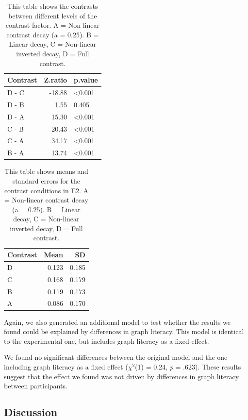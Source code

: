 \documentclass[preprint, 3p,
authoryear]{elsarticle} %
\begin{document}
\begin{table}

\caption{\label{tab:contrasts-table-e2}\label{contrasts-table-e2}This table shows the contrasts between different levels of the contrast factor. A = Non-linear contrast decay (a = 0.25). B = Linear decay, C = Non-linear inverted decay, D = Full contrast.}
\centering
\begin{tabular}[t]{lrl}
\toprule
Contrast & Z.ratio & p.value\\
\midrule
D - C & -18.88 & <0.001\\
D - B & 1.55 & 0.405\\
D - A & 15.30 & <0.001\\
C - B & 20.43 & <0.001\\
C - A & 34.17 & <0.001\\
\addlinespace
B - A & 13.74 & <0.001\\
\bottomrule
\end{tabular}
\end{table}

\begin{table}

\caption{\label{tab:sum-stats-e2}\label{sum-stats-e2}This table shows means and standard errors for the contrast conditions in E2. A = Non-linear contrast decay (a = 0.25). B = Linear decay, C = Non-linear inverted decay, D = Full contrast.}
\centering
\begin{tabular}[t]{lrr}
\toprule
Contrast & Mean & SD\\
\midrule
D & 0.123 & 0.185\\
C & 0.168 & 0.179\\
B & 0.119 & 0.173\\
A & 0.086 & 0.170\\
\bottomrule
\end{tabular}
\end{table}

Again, we also generated an additional model to test whether the results
we found could be explained by differences in graph literacy. This model
is identical to the experimental one, but includes graph literacy as a
fixed effect.

We found no significant differences between the original model and the
one including graph literacy as a fixed effect (\(\chi^2\)(1) = 0.24,
\emph{p} = .623). These results suggest that the effect we found was not
driven by differences in graph literacy between participants.

\hypertarget{discussion-1}{%
\subsection{Discussion}\label{discussion-1}}
\end{document}
